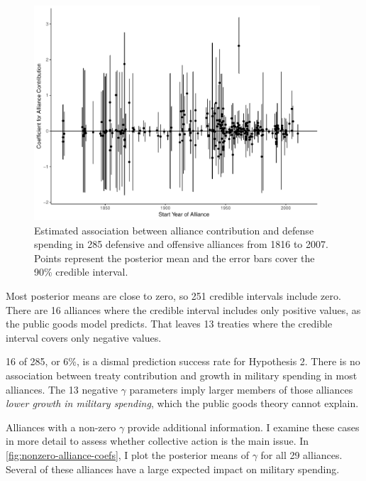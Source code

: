 \documentclass[12pt]{article}
\begin{document}
\begin{figure}[htbp]
	\centering
		\includegraphics[width=0.95\textwidth]{alliance-coefs-year.pdf}
	\caption{Estimated association between alliance contribution and defense spending in 285 defensive and offensive alliances from 1816 to 2007. Points represent the posterior mean and the error bars cover the 90\% credible interval.}
	\label{fig:alliance-coefs-year}
\end{figure}


Most posterior means are close to zero, so 251 credible intervals include zero. 
There are 16 alliances where the credible interval includes only positive values, as the public goods model predicts. 
That leaves 13 treaties where the credible interval covers only negative values. 


16 of 285, or 6\%, is a dismal prediction success rate for Hypothesis 2. 
There is no association between treaty contribution and growth in military spending in most alliances.
The 13 negative $\gamma$ parameters imply larger members of those alliances \emph{lower growth in military spending}, which the public goods theory cannot explain. 


Alliances with a non-zero $\gamma$ provide additional information. 
I examine these cases in more detail to assess whether collective action is the main issue. 
In \autoref{fig:nonzero-alliance-coefs}, I plot the posterior means of $\gamma$ for all 29 alliances.  
Several of these alliances have a large expected impact on military spending. 
\end{document}
